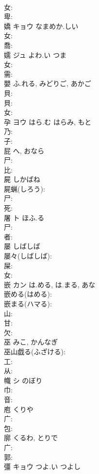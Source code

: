 \documentclass[8pt]{extreport}
\begin{document}
\begin{CJK}{UTF8}{min}
\\	女: 
\\	卑: 
\\	嬌	キョウ	なまめか.しい		
\\	女: 
\\	喬: 
\\	嬬	ジュ	よわ.い	つま	
\\	女: 
\\	需: 
\\	嬰		ふ.れる, みどりご, あかご			
\\	貝: 
\\	貝: 
\\	女: 
\\	孕	ヨウ	はら.む	はらみ, もと	
\\	乃: 
\\	子: 
\\	屁		へ, おなら			
\\	尸: 
\\	比: 
\\	屍		しかばね			
\\	屍蝋(しろう): 
\\	尸: 
\\	死: 
\\	屠	ト	ほふ.る		
\\	尸: 
\\	者: 
\\	屡		しばしば			
\\	屡々(しばしば): 
\\	屎: 
\\	女: 
\\	嵌	カン	は.める, は.まる, あな		
\\	嵌める(はめる): 
\\	嵌まる(ハマる): 
\\	山: 
\\	甘: 
\\	欠: 
\\	巫		みこ, かんなぎ			
\\	巫山戯る(ふざける): 
\\	工: 
\\	从: 
\\	幟	シ	のぼり		
\\	巾: 
\\	音: 
\\	庖		くりや			
\\	广: 
\\	包: 
\\	廓		くるわ, とりで			
\\	广: 
\\	郭: 
\\	彊	キョウ	つよ.い	つよし	

\end{CJK}
\end{document}
